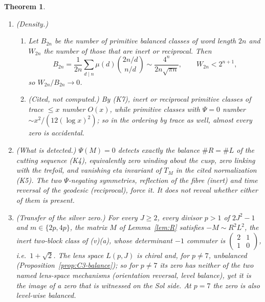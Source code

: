 \documentclass[11pt]{article}
\newtheorem{theorem}{Theorem}[section]
\theoremstyle{definition}
\begin{document}
\begin{theorem}
\begin{enumerate}[label=(\roman*)]
\begin{enumerate}[label=(\alph*)]
with $n=3$ the class of $M_2$.  For unrestricted four-block tuples
$(a,b,c,d)$, the class is inert iff $a=b=c=d$.
\end{enumerate}
\item \textup{(Density.)}
\begin{enumerate}[label=(\alph*)]
\item Let $B_{2n}$ be the number of primitive balanced classes of word
length $2n$ and $W_{2n}$ the number of those that are inert or
reciprocal.  Then
\[
 B_{2n}=\frac1{2n}\sum_{d\mid n}\mu(d)\binom{2n/d}{n/d}
 \sim\frac{4^n}{2n\sqrt{\pi n}},\qquad W_{2n}<2^{n+1},
\]
so $W_{2n}/B_{2n}\to0$.
\item \textup{(Cited, not computed.)}  By (K7), inert or reciprocal
primitive classes of trace $\leq x$ number $O(x)$, while primitive
classes with $\Psi=0$ number $\sim x^2/(12(\log x)^2)$; so in the
ordering by trace as well, almost every zero is accidental.
\end{enumerate}
\item \textup{(What is detected.)}  $\Psi(M)=0$ detects exactly the
balance $\#R=\#L$ of the cutting sequence (K4), equivalently zero
winding about the cusp, zero linking with the trefoil, and vanishing
eta invariant of $T_M$ in the cited normalization (K5).  The two
$\Psi$-negating symmetries, reflection of the fibre (inert) and time
reversal of the geodesic (reciprocal), force it.  It does not reveal
whether either of them is present.
\item \textup{(Transfer of the silver zero.)}  For every $J\geq2$, every
divisor $p>1$ of $2J^2-1$ and $m\in\{2p,4p\}$, the matrix $M$ of
Lemma~\ref{lem:R} satisfies $-M\sim R^2L^2$, the inert two-block class of
(v)(a), whose determinant $-1$ commuter is $\begin{pmatrix}2&1\\1&0\end{pmatrix}$,
i.e.\ $1+\sqrt2$.  The lens space $L(p,J)$ is chiral and, for $p\neq7$,
unbalanced (Proposition~\ref{prop:C3-balance}); so for $p\neq7$ its zero
has neither of the two named lens-space mechanisms (orientation
reversal, level balance), yet it is the image of a zero that is
witnessed on the Sol side.  At $p=7$ the zero is also level-wise
balanced.
\end{enumerate}
\end{theorem}
\end{document}
